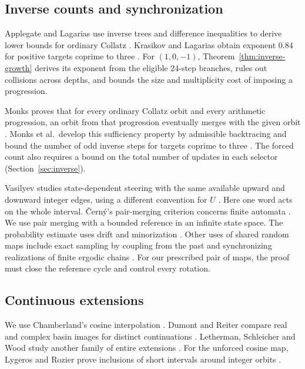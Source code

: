 \subsection{Inverse counts and synchronization}

Applegate and Lagarias use inverse trees and difference inequalities
to derive lower bounds for ordinary Collatz
\cite{applegate-lagarias-1995-i,applegate-lagarias-1995-ii}. Krasikov and
Lagarias obtain exponent $0.84$ for positive targets coprime to three
\cite[Theorems~2.2 and~6.1]{krasikov-lagarias}. For $(1,0,-1)$,
Theorem~\ref{thm:inverse-growth} derives its exponent from the eligible
24-step branches, rules out collisions across depths, and bounds the
size and multiplicity cost of imposing a progression.

Monks proves that for every ordinary Collatz orbit and every arithmetic
progression, an orbit from that progression eventually merges with the
given orbit \cite{monks-2006}. Monks et al.\ develop this sufficiency
property by admissible backtracing and bound the number of odd inverse
steps for targets coprime to three \cite{monks-et-al-2013}. The forced
count also requires a bound on the total number of updates in each
selector (Section~\ref{sec:inverse}).

Vasilyev studies state-dependent steering with the same available
upward and downward integer edges, using a different convention for $U$
\cite[Section~4]{vasilyev-2026}. Here one word acts on the whole
interval. \v{C}ern\'y's pair-merging criterion concerns finite automata
\cite[Theorem~2]{cerny-1964}. We use pair merging with a bounded
reference in an infinite state space. The probability estimate uses
drift and minorization \cite{rosenthal-1995}. Other uses of shared
random maps include exact sampling by coupling from the past
\cite{propp-wilson-1996} and synchronizing realizations of finite
ergodic chains \cite{yano-yasutomi-2011}. For our prescribed pair of
maps, the proof must close the reference cycle and control every rotation.

\subsection{Continuous extensions}

We use Chamberland's cosine interpolation
\cite{chamberland-1996,chamberland-survey}. Dumont and Reiter compare real
and complex basin images for distinct continuations
\cite{dumont-reiter-2001,dumont-reiter-2003}. Letherman, Schleicher and
Wood study another family of entire extensions
\cite{letherman-schleicher-wood-1999}. For the unforced cosine map,
Lygeros and Rozier prove inclusions of short intervals around integer
orbits \cite{lygeros-rozier-2014}.

